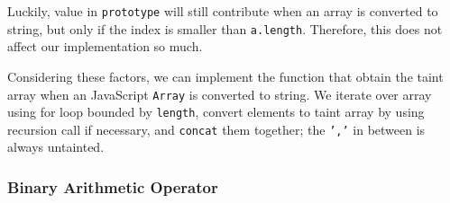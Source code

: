 Luckily, value in \texttt{prototype} will still contribute when an array is converted to string, but only if the index is smaller than \texttt{a.length}. Therefore, this does not affect our implementation so much.

Considering these factors, we can implement the function that obtain the taint array when an JavaScript \texttt{Array} is converted to string. We iterate over array using for loop bounded by \texttt{length}, convert elements to taint array by using recursion call if necessary, and \texttt{concat} them together; the \texttt{','} in between is always untainted.

\subsubsection{Binary Arithmetic Operator}

